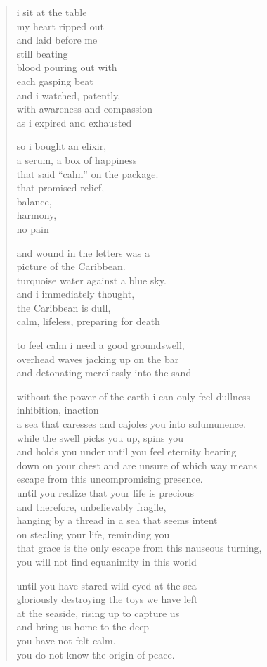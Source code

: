 \begin{verse}
i sit at the table\\
my heart ripped out \\
and laid before me\\
still beating \\
blood pouring out with \\
each gasping beat\\
and i watched, patently,\\
with awareness and compassion\\
as i expired and exhausted

so i bought an elixir,\\
a serum, a box of happiness\\
that said ``calm'' on the package.\\
that promised relief,\\
balance,\\
harmony,\\
no pain

and wound in the letters was a\\
picture of the Caribbean.\\
turquoise water against a blue sky.\\
and i immediately thought,\\
the Caribbean is dull,\\
calm, lifeless, preparing for death

to feel calm i need a good groundswell,\\
overhead waves jacking up on the bar\\
and detonating mercilessly into the sand

without the power of the earth i can only feel dullness\\
inhibition, inaction\\
a sea that caresses and cajoles you into solumunence.\\
while the swell  picks you up, spins you\\
and holds you under until you feel eternity bearing \\
down on your chest and are unsure of which way means\\
escape from this uncompromising presence.\\
until you realize that your life is precious\\
and therefore, unbelievably fragile,\\
hanging by a thread in a sea that seems intent\\
on stealing your life, reminding you \\
that grace is the only escape from this nauseous turning,\\
you will not find equanimity in this world

until you have stared wild eyed at the sea \\
gloriously destroying the toys we have left \\
at the seaside, rising up to capture us\\
and bring us home to the deep\\
you have not felt calm.\\
you do not know the origin of peace.
\end{verse}
